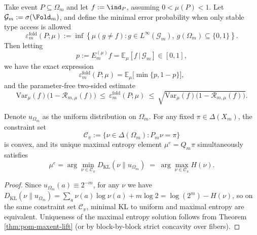 \begin{theorem}\label{thm:pom-visibility-to-error-two-sided}
Take event $P\subseteq\Omega_m$ and let $f:=\ind_P$, assuming $0<\mu(P)<1$.
Let $\mathcal{G}_m:=\sigma(\Fold_m)$, and define the minimal error probability when only stable type access is allowed
\[
\varepsilon_m^{\mathrm{fold}}(P;\mu)
:=\inf\left\{\mu(g\neq f): g\in L^\infty(\mathcal{G}_m),\ g(\Omega_m)\subseteq\{0,1\}\right\}.
\]
Then letting
\[
p:=E_m^{(\mu)}f=\mathbb{E}_\mu[f\,|\,\mathcal{G}_m]\in[0,1],
\]
we have the exact expression
\[
\varepsilon_m^{\mathrm{fold}}(P;\mu)=\mathbb{E}_\mu\bigl[\min\{p,1-p\}\bigr],
\]
and the parameter-free two-sided estimate
\[
\mathrm{Var}_\mu(f)\bigl(1-\mathcal{R}_{m,\mu}(f)\bigr)
\ \le\
\varepsilon_m^{\mathrm{fold}}(P;\mu)
\ \le\
\sqrt{\mathrm{Var}_\mu(f)\bigl(1-\mathcal{R}_{m,\mu}(f)\bigr)}.
\]
\end{theorem}

\begin{corollary}\label{cor:pom-Iproj-maxent}
Denote $u_{\Omega_m}$ as the uniform distribution on $\Omega_m$. For any fixed $\pi\in\Delta(X_m)$, the constraint set
\[
\mathcal{C}_\pi:=\{\nu\in\Delta(\Omega_m):P_m\nu=\pi\}
\]
is convex, and its unique maximal entropy element $\mu^e=Q_m\pi$ simultaneously satisfies
\[
\boxed{\;
\mu^e=\arg\min_{\nu\in\mathcal{C}_\pi}D_{\mathrm{KL}}(\nu\|u_{\Omega_m})
\;=\;
\arg\max_{\nu\in\mathcal{C}_\pi}H(\nu).
\;}
\]
\end{corollary}
\begin{proof}
Since $u_{\Omega_m}(a)\equiv 2^{-m}$, for any $\nu$ we have
\(
D_{\mathrm{KL}}(\nu\|u_{\Omega_m})=\sum_a \nu(a)\log\nu(a)+m\log 2=\log(2^m)-H(\nu)
\),
so on the same constraint set $\mathcal{C}_\pi$, minimal KL to uniform and maximal entropy are equivalent.
Uniqueness of the maximal entropy solution follows from Theorem \ref{thm:pom-maxent-lift} (or by block-by-block strict concavity over fibers).
\end{proof}

